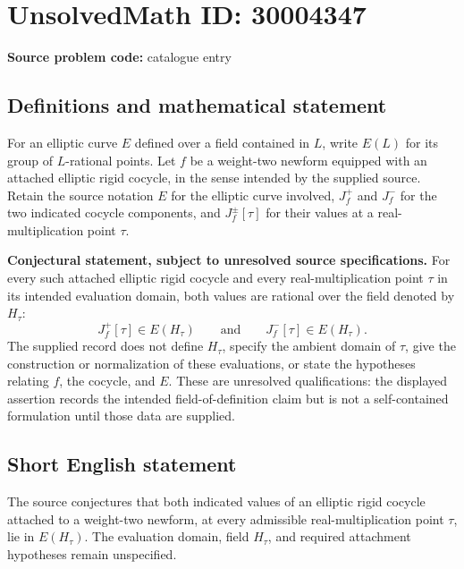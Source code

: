 \documentclass[11pt]{article}
\begin{document}
\section*{UnsolvedMath ID: 30004347}
\textbf{Source problem code:} catalogue entry
\subsection{Definitions and mathematical statement}
For an elliptic curve \(E\) defined over a field contained in \(L\), write \(E(L)\) for its group of \(L\)-rational points. Let \(f\) be a weight-two newform equipped with an attached elliptic rigid cocycle, in the sense intended by the supplied source. Retain the source notation \(E\) for the elliptic curve involved, \(J_f^+\) and \(J_f^-\) for the two indicated cocycle components, and \(J_f^\pm[\tau]\) for their values at a real-multiplication point \(\tau\).

\textbf{Conjectural statement, subject to unresolved source specifications.} For every such attached elliptic rigid cocycle and every real-multiplication point \(\tau\) in its intended evaluation domain, both values are rational over the field denoted by \(H_\tau\):
\[
J_f^+[\tau]\in E(H_\tau)
\qquad\text{and}\qquad
J_f^-[\tau]\in E(H_\tau).
\]
The supplied record does not define \(H_\tau\), specify the ambient domain of \(\tau\), give the construction or normalization of these evaluations, or state the hypotheses relating \(f\), the cocycle, and \(E\). These are unresolved qualifications: the displayed assertion records the intended field-of-definition claim but is not a self-contained formulation until those data are supplied.
\subsection{Short English statement}
The source conjectures that both indicated values of an elliptic rigid cocycle attached to a weight-two newform, at every admissible real-multiplication point \(\tau\), lie in \(E(H_\tau)\). The evaluation domain, field \(H_\tau\), and required attachment hypotheses remain unspecified.
\end{document}
